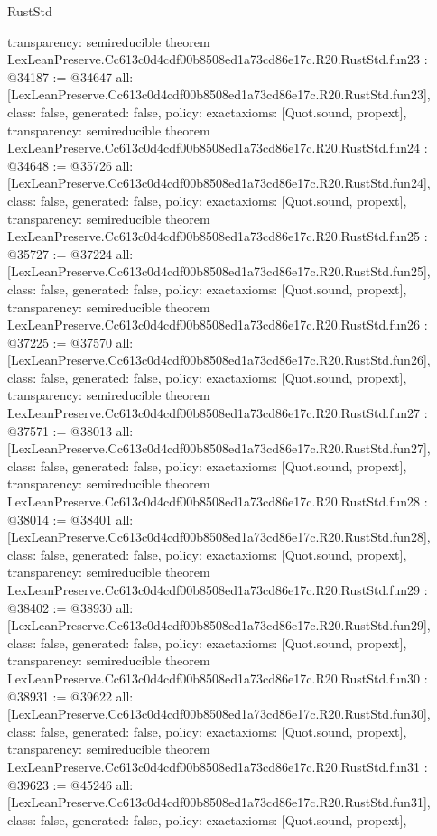 \begin{lexlean}{RustStd}
\begin{coremodule}
{  transparency: semireducible
}
theorem LexLeanPreserve.Cc613c0d4cdf00b8508ed1a73cd86e17c.R20.RustStd.fun23 : @34187 := @34647 {
  all: [LexLeanPreserve.Cc613c0d4cdf00b8508ed1a73cd86e17c.R20.RustStd.fun23],
  class: false,
  generated: false,
  policy: exact{axioms: [Quot.sound, propext]},
  transparency: semireducible
}
theorem LexLeanPreserve.Cc613c0d4cdf00b8508ed1a73cd86e17c.R20.RustStd.fun24 : @34648 := @35726 {
  all: [LexLeanPreserve.Cc613c0d4cdf00b8508ed1a73cd86e17c.R20.RustStd.fun24],
  class: false,
  generated: false,
  policy: exact{axioms: [Quot.sound, propext]},
  transparency: semireducible
}
theorem LexLeanPreserve.Cc613c0d4cdf00b8508ed1a73cd86e17c.R20.RustStd.fun25 : @35727 := @37224 {
  all: [LexLeanPreserve.Cc613c0d4cdf00b8508ed1a73cd86e17c.R20.RustStd.fun25],
  class: false,
  generated: false,
  policy: exact{axioms: [Quot.sound, propext]},
  transparency: semireducible
}
theorem LexLeanPreserve.Cc613c0d4cdf00b8508ed1a73cd86e17c.R20.RustStd.fun26 : @37225 := @37570 {
  all: [LexLeanPreserve.Cc613c0d4cdf00b8508ed1a73cd86e17c.R20.RustStd.fun26],
  class: false,
  generated: false,
  policy: exact{axioms: [Quot.sound, propext]},
  transparency: semireducible
}
theorem LexLeanPreserve.Cc613c0d4cdf00b8508ed1a73cd86e17c.R20.RustStd.fun27 : @37571 := @38013 {
  all: [LexLeanPreserve.Cc613c0d4cdf00b8508ed1a73cd86e17c.R20.RustStd.fun27],
  class: false,
  generated: false,
  policy: exact{axioms: [Quot.sound, propext]},
  transparency: semireducible
}
theorem LexLeanPreserve.Cc613c0d4cdf00b8508ed1a73cd86e17c.R20.RustStd.fun28 : @38014 := @38401 {
  all: [LexLeanPreserve.Cc613c0d4cdf00b8508ed1a73cd86e17c.R20.RustStd.fun28],
  class: false,
  generated: false,
  policy: exact{axioms: [Quot.sound, propext]},
  transparency: semireducible
}
theorem LexLeanPreserve.Cc613c0d4cdf00b8508ed1a73cd86e17c.R20.RustStd.fun29 : @38402 := @38930 {
  all: [LexLeanPreserve.Cc613c0d4cdf00b8508ed1a73cd86e17c.R20.RustStd.fun29],
  class: false,
  generated: false,
  policy: exact{axioms: [Quot.sound, propext]},
  transparency: semireducible
}
theorem LexLeanPreserve.Cc613c0d4cdf00b8508ed1a73cd86e17c.R20.RustStd.fun30 : @38931 := @39622 {
  all: [LexLeanPreserve.Cc613c0d4cdf00b8508ed1a73cd86e17c.R20.RustStd.fun30],
  class: false,
  generated: false,
  policy: exact{axioms: [Quot.sound, propext]},
  transparency: semireducible
}
theorem LexLeanPreserve.Cc613c0d4cdf00b8508ed1a73cd86e17c.R20.RustStd.fun31 : @39623 := @45246 {
  all: [LexLeanPreserve.Cc613c0d4cdf00b8508ed1a73cd86e17c.R20.RustStd.fun31],
  class: false,
  generated: false,
  policy: exact{axioms: [Quot.sound, propext]},
}
\end{coremodule}
\end{lexlean}
